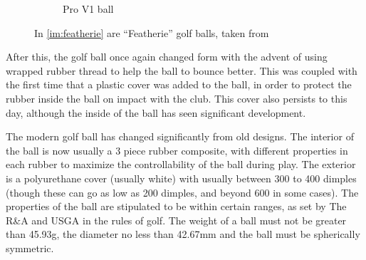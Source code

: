 \begin{figure}[h]
\begin{subfigure}[b]{0.4\textwidth}
\caption{Pro V1 ball}
\label{im:pv2}
\end{subfigure}
\caption{In \ref{im:featherie} are ``Featherie'' golf balls, taken from }
\end{figure}

After this, the golf ball once again changed form with the advent of using wrapped rubber
thread to help the ball to bounce better. This was coupled with the first time that a plastic
cover was added to the ball, in order to protect the rubber inside the ball on impact with the
club. This cover also persists to this day, although the inside of the ball has seen significant
development.

The modern golf ball has changed significantly from old designs. The interior of the ball is
now usually a 3 piece rubber composite, with different properties in each rubber to maximize
the controllability of the ball during play. The exterior is a polyurethane cover (usually white)
with usually between 300 to 400 dimples (though these can go as low as 200 dimples, and
beyond 600 in some cases). The properties of the ball are stipulated to be within certain ranges,
as set by The R\&A and USGA in the rules of golf. The weight of a ball must not be greater
than 45.93g, the diameter no less than 42.67mm and the ball must be spherically symmetric.
